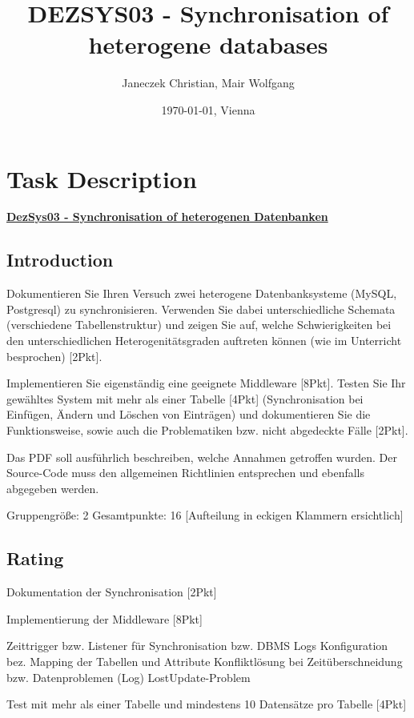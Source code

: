 \documentclass[11pt,a4paper]{article}
\title{\bf DEZSYS03 - Synchronisation of heterogene databases}
\author{Janeczek Christian, Mair Wolfgang}
\affil{IT Department TGM, Vienna}
\date{\today{}, Vienna}
\begin{document}
\maketitle
\pagestyle{fancy}
\fancyhf{}
\newpage
\tableofcontents
{}
\newpage

\section{Task Description}
\textbf{\underline{DezSys03 - Synchronisation of heterogenen Datenbanken}}

\subsection{Introduction}

Dokumentieren Sie Ihren Versuch zwei heterogene Datenbanksysteme (MySQL, Postgresql) zu synchronisieren. Verwenden Sie dabei unterschiedliche Schemata (verschiedene Tabellenstruktur) und zeigen Sie auf, welche Schwierigkeiten bei den unterschiedlichen Heterogenitätsgraden auftreten können (wie im Unterricht besprochen) [2Pkt].

Implementieren Sie eigenständig eine geeignete Middleware [8Pkt]. Testen Sie Ihr gewähltes System mit mehr als einer Tabelle [4Pkt] (Synchronisation bei Einfügen, Ändern und Löschen von Einträgen) und dokumentieren Sie die Funktionsweise, sowie auch die Problematiken bzw. nicht abgedeckte Fälle [2Pkt].

Das PDF soll ausführlich beschreiben, welche Annahmen getroffen wurden. Der Source-Code muss den allgemeinen Richtlinien entsprechen und ebenfalls abgegeben werden.

Gruppengröße: 2
Gesamtpunkte: 16 [Aufteilung in eckigen Klammern ersichtlich]

\subsection{Rating}

Dokumentation der Synchronisation [2Pkt]

Implementierung der Middleware [8Pkt]

Zeittrigger bzw. Listener für Synchronisation bzw. DBMS Logs
Konfiguration bez. Mapping der Tabellen und Attribute
Konfliktlösung bei Zeitüberschneidung bzw. Datenproblemen (Log)
LostUpdate-Problem

Test mit mehr als einer Tabelle und mindestens 10 Datensätze pro Tabelle [4Pkt]
\end{document}
